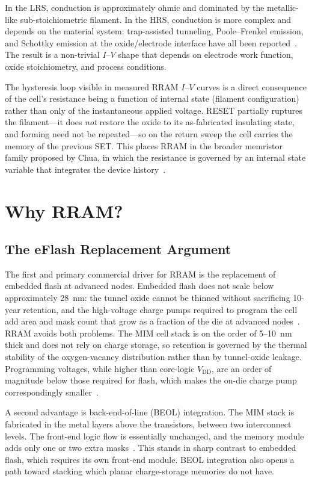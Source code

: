 \documentclass[lettersize,journal]{IEEEtran}
\begin{document}
In the LRS, conduction is approximately ohmic and dominated by the metallic-like sub-stoichiometric filament. In the HRS, conduction is more complex and depends on the material system: trap-assisted tunneling, Poole--Frenkel emission, and Schottky emission at the oxide/electrode interface have all been reported~\cite{ref_wong2012}. The result is a non-trivial $I$--$V$ shape that depends on electrode work function, oxide stoichiometry, and process conditions.

The hysteresis loop visible in measured RRAM $I$--$V$ curves is a direct consequence of the cell's resistance being a function of internal state (filament configuration) rather than only of the instantaneous applied voltage. RESET partially ruptures the filament---it does \textit{not} restore the oxide to its as-fabricated insulating state, and forming need not be repeated---so on the return sweep the cell carries the memory of the previous SET. This places RRAM in the broader memristor family proposed by Chua, in which the resistance is governed by an internal state variable that integrates the device history~\cite{ref_ielmini2016,ref_ielmini_wong2018}.

\section{Why RRAM?}\label{sec:why}

\subsection{The eFlash Replacement Argument}
The first and primary commercial driver for RRAM is the replacement of embedded flash at advanced nodes. Embedded flash does not scale below approximately 28~nm: the tunnel oxide cannot be thinned without sacrificing 10-year retention, and the high-voltage charge pumps required to program the cell add area and mask count that grow as a fraction of the die at advanced nodes~\cite{ref_hellenbrand2024}. RRAM avoids both problems. The MIM cell stack is on the order of 5--10~nm thick and does not rely on charge storage, so retention is governed by the thermal stability of the oxygen-vacancy distribution rather than by tunnel-oxide leakage. Programming voltages, while higher than core-logic $V_\mathrm{DD}$, are an order of magnitude below those required for flash, which makes the on-die charge pump correspondingly smaller~\cite{ref_wong2012,ref_hellenbrand2024}.

A second advantage is back-end-of-line (BEOL) integration. The MIM stack is fabricated in the metal layers above the transistors, between two interconnect levels. The front-end logic flow is essentially unchanged, and the memory module adds only one or two extra masks~\cite{ref_wong2012}. This stands in sharp contrast to embedded flash, which requires its own front-end module. BEOL integration also opens a path toward stacking which planar charge-storage memories do not have.
\end{document}
